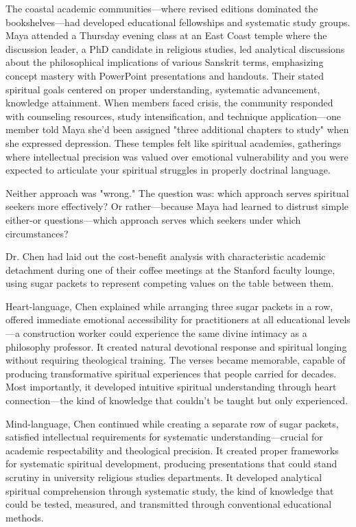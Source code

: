 \documentclass[12pt,twoside]{book}
\begin{document}
The coastal academic communities—where revised editions dominated the bookshelves—had developed educational fellowships and systematic study groups. Maya attended a Thursday evening class at an East Coast temple where the discussion leader, a PhD candidate in religious studies, led analytical discussions about the philosophical implications of various Sanskrit terms, emphasizing concept mastery with PowerPoint presentations and handouts. Their stated spiritual goals centered on proper understanding, systematic advancement, knowledge attainment. When members faced crisis, the community responded with counseling resources, study intensification, and technique application—one member told Maya she'd been assigned "three additional chapters to study" when she expressed depression. These temples felt like spiritual academies, gatherings where intellectual precision was valued over emotional vulnerability and you were expected to articulate your spiritual struggles in properly doctrinal language.

Neither approach was "wrong." The question was: which approach serves spiritual seekers more effectively? Or rather—because Maya had learned to distrust simple either-or questions—which approach serves which seekers under which circumstances?

Dr. Chen had laid out the cost-benefit analysis with characteristic academic detachment during one of their coffee meetings at the Stanford faculty lounge, using sugar packets to represent competing values on the table between them.

Heart-language, Chen explained while arranging three sugar packets in a row, offered immediate emotional accessibility for practitioners at all educational levels—a construction worker could experience the same divine intimacy as a philosophy professor. It created natural devotional response and spiritual longing without requiring theological training. The verses became memorable, capable of producing transformative spiritual experiences that people carried for decades. Most importantly, it developed intuitive spiritual understanding through heart connection—the kind of knowledge that couldn't be taught but only experienced.

Mind-language, Chen continued while creating a separate row of sugar packets, satisfied intellectual requirements for systematic understanding—crucial for academic respectability and theological precision. It created proper frameworks for systematic spiritual development, producing presentations that could stand scrutiny in university religious studies departments. It developed analytical spiritual comprehension through systematic study, the kind of knowledge that could be tested, measured, and transmitted through conventional educational methods.
\end{document}
